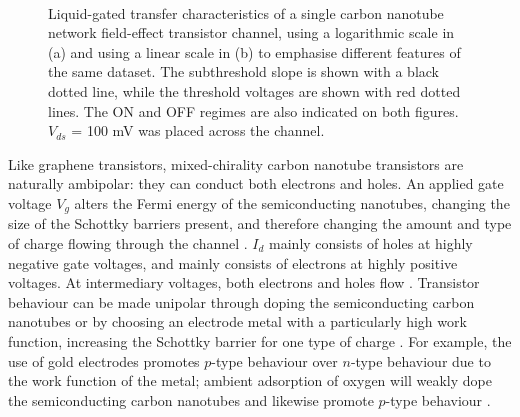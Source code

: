 \documentclass[
  a4paper,
]{scrbook}
\begin{document}
\begin{figure}
\begin{minipage}[t]{0.45\linewidth}
{{}

}

\end{minipage}%
%
\begin{minipage}[t]{0.01\linewidth}

{\centering 

~

}

\end{minipage}%

\caption{\label{fig-CNT-characteristics}Liquid-gated transfer
characteristics of a single carbon nanotube network field-effect
transistor channel, using a logarithmic scale in (a) and using a linear
scale in (b) to emphasise different features of the same dataset. The
subthreshold slope is shown with a black dotted line, while the
threshold voltages are shown with red dotted lines. The ON and OFF
regimes are also indicated on both figures. \(V_{ds}\) = 100 mV was
placed across the channel.}

\end{figure}

Like graphene transistors, mixed-chirality carbon nanotube transistors
are naturally ambipolar: they can conduct both electrons and holes. An
applied gate voltage \(V_g\) alters the Fermi energy of the
semiconducting nanotubes, changing the size of the Schottky barriers
present, and therefore changing the amount and type of charge flowing
through the channel \autocite{Nakanishi2002,Avouris2007,Heller2008}.
\(I_d\) mainly consists of holes at highly negative gate voltages, and
mainly consists of electrons at highly positive voltages. At
intermediary voltages, both electrons and holes flow
\autocite{Avouris2007,Yao2021}. Transistor behaviour can be made
unipolar through doping the semiconducting carbon nanotubes or by
choosing an electrode metal with a particularly high work function,
increasing the Schottky barrier for one type of charge
\autocite{Avouris2007,Cao2009,Yao2021}. For example, the use of gold
electrodes promotes \(p\)-type behaviour over \(n\)-type behaviour due
to the work function of the metal; ambient adsorption of oxygen will
weakly dope the semiconducting carbon nanotubes and likewise promote
\(p\)-type behaviour \autocite{McEuen2002,Cao2009,Shkodra2021}.
\end{document}
